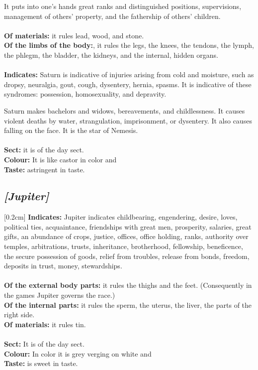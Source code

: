 It puts into one’s hands great ranks and distinguished positions, supervisions, management of others’ property, and the fathership of others’ children. \\
\\
\textbf{Of materials:} it rules lead, wood, and stone. \\
\textbf{Of the limbs of the body:}, it rules the legs, the knees, the tendons, the lymph, the phlegm, the bladder, the kidneys, and the internal, hidden organs. \\
\\
\textbf{Indicates:} Saturn is indicative of injuries arising from cold and moisture, such as dropsy, neuralgia, gout, cough, dysentery, hernia, spasms. It is indicative of these syndromes: possession, homosexuality, and depravity. 

Saturn makes bachelors and widows, bereavements, and childlessness. It causes violent deaths by water, strangulation, imprisonment, or dysentery. It also causes falling on the face. It is the star of Nemesis. \\
\\
\textbf{Sect:} it is of the day sect.\\
\textbf{Colour:} It is like castor in color and \\
\textbf{Taste:} astringent in taste.

\secbr
\subsection{\textit{[Jupiter]}}
[0.2cm]
\noindent
\textbf{Indicates:} Jupiter indicates childbearing, engendering, desire, loves, political ties, acquaintance, friendships with great men, prosperity, salaries, great gifts, an abundance of crops, justice, offices, office holding, ranks, authority over temples, arbitrations, trusts, inheritance, brotherhood, fellowship, beneficence, the secure possession of goods, relief from troubles, release from bonds, freedom, deposits in trust, money, stewardships. \\
\\
\textbf{Of the external body parts:} it rules the thighs and the feet. (Consequently in the games Jupiter governs the race.)\\
\textbf{Of the internal parts:}  it rules the sperm, the uterus, the liver, the parts of the right side. \\
\textbf{Of materials:} it rules tin. \\
\\
\textbf{Sect:} It is of the day sect. \\
\textbf{Colour:} In color it is grey verging on white and \\
\textbf{Taste:} is sweet in taste.

